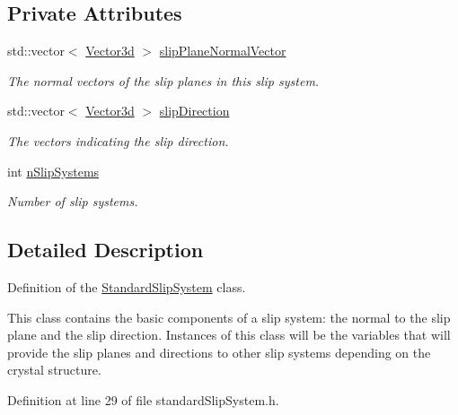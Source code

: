 \subsection*{\-Private \-Attributes}
\begin{DoxyCompactItemize}
\item 
std\-::vector$<$ \hyperlink{classVector3d}{\-Vector3d} $>$ \hyperlink{classStandardSlipSystem_ad26f5235cfada6bec941410a2a002e6b}{slip\-Plane\-Normal\-Vector}
\begin{DoxyCompactList}\small\item\em \-The normal vectors of the slip planes in this slip system. \end{DoxyCompactList}\item 
std\-::vector$<$ \hyperlink{classVector3d}{\-Vector3d} $>$ \hyperlink{classStandardSlipSystem_af374545c3095d91935eb1a7fc5cc55c2}{slip\-Direction}
\begin{DoxyCompactList}\small\item\em \-The vectors indicating the slip direction. \end{DoxyCompactList}\item 
int \hyperlink{classStandardSlipSystem_a893e6d9f9192061d9d3c83a9b8d0d61d}{n\-Slip\-Systems}
\begin{DoxyCompactList}\small\item\em \-Number of slip systems. \end{DoxyCompactList}\end{DoxyCompactItemize}


\subsection{\-Detailed \-Description}
\-Definition of the \hyperlink{classStandardSlipSystem}{\-Standard\-Slip\-System} class. 

\-This class contains the basic components of a slip system\-: the normal to the slip plane and the slip direction. \-Instances of this class will be the variables that will provide the slip planes and directions to other slip systems depending on the crystal structure. 

\-Definition at line 29 of file standard\-Slip\-System.\-h.



